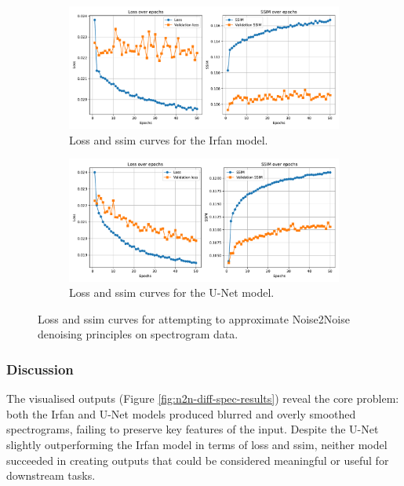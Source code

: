 \begin{figure}[p]
    \begin{subfigure}{\textwidth}
        \centering
        \includegraphics[width=\textwidth]{img/ch6/in_neq_out/irfan/loss_ssim_curves.pdf}
        \caption{Loss and \acrshort{ssim} curves for the Irfan model.}
        \label{fig:n2n-diff-spec-loss-curves-irfan}
    \end{subfigure}

    \vspace{0.5cm}

    \begin{subfigure}{\textwidth}
        \centering
        \includegraphics[width=\textwidth]{img/ch6/in_neq_out/unet/loss_ssim_curves.pdf}
        \caption{Loss and \acrshort{ssim} curves for the U-Net model.}
        \label{fig:n2n-diff-spec-loss-curves-unet}
    \end{subfigure}
    \label{fig:n2n-diff-spec-loss-curves}
    \caption{Loss and \acrshort{ssim} curves for attempting to approximate Noise2Noise denoising principles on spectrogram data.}
\end{figure}

\subsubsection{Discussion}
The visualised outputs (Figure \ref{fig:n2n-diff-spec-results}) reveal the core problem: both the Irfan and U-Net models produced blurred and overly smoothed spectrograms, failing to preserve key features of the input. Despite the U-Net slightly outperforming the Irfan model in terms of loss and \acrshort{ssim}, neither model succeeded in creating outputs that could be considered meaningful or useful for downstream tasks.

